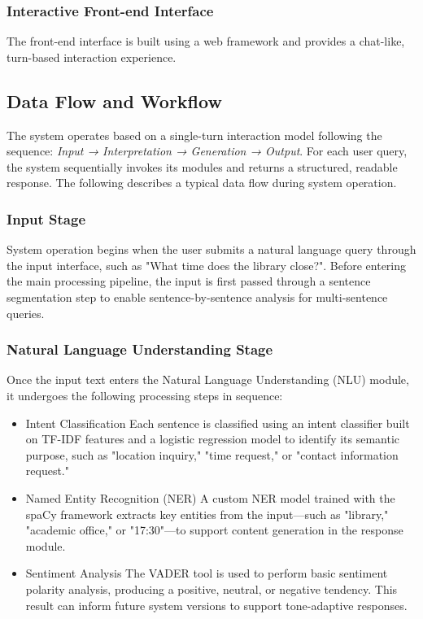 \documentclass{xum_review}
\begin{document}
	\subsubsection{Interactive Front-end Interface}

	The front-end interface is built using a web framework and provides a chat-like, turn-based interaction experience.

	\subsection{Data Flow and Workflow}

	The system operates based on a single-turn interaction model following the sequence: \textit{Input → Interpretation → Generation
	→ Output}. For each user query, the system sequentially invokes its modules and returns a structured, readable response.
	The following describes a typical data flow during system operation.

	\subsubsection{Input Stage}

	System operation begins when the user submits a natural language query through the input interface, such as "What time
	does the library close?". Before entering the main processing pipeline, the input is first passed through a sentence
	segmentation step to enable sentence-by-sentence analysis for multi-sentence queries.

	\subsubsection{Natural Language Understanding Stage}

	Once the input text enters the Natural Language Understanding (NLU) module, it undergoes the following processing steps in sequence:
	\begin{itemize}
		\item	Intent Classification Each sentence is classified using an intent classifier built on TF-IDF features
	and a logistic regression model to identify its semantic purpose, such as "location inquiry," "time request," or
	"contact information request."
		\item	Named Entity Recognition (NER) A custom NER model trained with the spaCy framework extracts key entities
	from the input—such as "library," "academic office," or "17:30"—to support content generation in the response
	module.
		\item	Sentiment Analysis The VADER tool is used to perform basic sentiment polarity analysis, producing a
		positive, neutral, or negative tendency. This result can inform future system versions to support tone-adaptive
		responses.
	\end{itemize}
\end{document}
